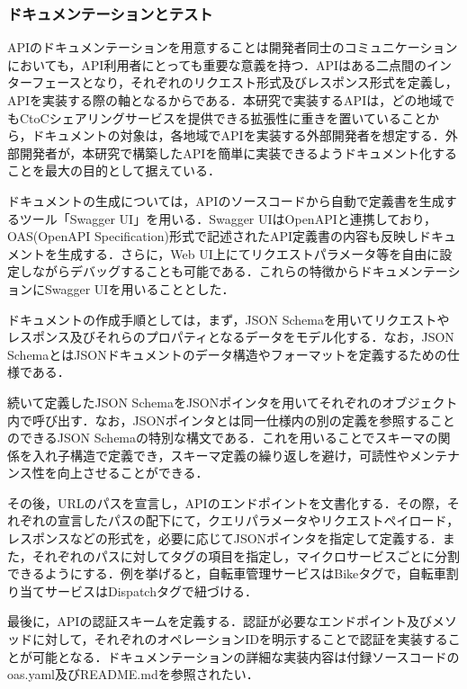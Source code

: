       \subsubsection{ドキュメンテーションとテスト}
        \label{sec:ドキュメンテーションとテスト}
          \par APIのドキュメンテーションを用意することは開発者同士のコミュニケーションにおいても，API利用者にとっても重要な意義を持つ．APIはある二点間のインターフェースとなり，それぞれのリクエスト形式及びレスポンス形式を定義し，APIを実装する際の軸となるからである．本研究で実装するAPIは，どの地域でもCtoCシェアリングサービスを提供できる拡張性に重きを置いていることから，ドキュメントの対象は，各地域でAPIを実装する外部開発者を想定する．外部開発者が，本研究で構築したAPIを簡単に実装できるようドキュメント化することを最大の目的として据えている．
          \par ドキュメントの生成については，APIのソースコードから自動で定義書を生成するツール「Swagger UI」を用いる．Swagger UIはOpenAPIと連携しており，OAS(OpenAPI Specification)形式で記述されたAPI定義書の内容も反映しドキュメントを生成する．さらに，Web UI上にてリクエストパラメータ等を自由に設定しながらデバッグすることも可能である．これらの特徴からドキュメンテーションにSwagger UIを用いることとした．
          \par ドキュメントの作成手順としては，まず，JSON Schemaを用いてリクエストやレスポンス及びそれらのプロパティとなるデータをモデル化する．なお，JSON SchemaとはJSONドキュメントのデータ構造やフォーマットを定義するための仕様である．
          \par 続いて定義したJSON SchemaをJSONポインタを用いてそれぞれのオブジェクト内で呼び出す．なお，JSONポインタとは同一仕様内の別の定義を参照することのできるJSON Schemaの特別な構文である．これを用いることでスキーマの関係を入れ子構造で定義でき，スキーマ定義の繰り返しを避け，可読性やメンテナンス性を向上させることができる．
          \par その後，URLのパスを宣言し，APIのエンドポイントを文書化する．その際，それぞれの宣言したパスの配下にて，クエリパラメータやリクエストペイロード，レスポンスなどの形式を，必要に応じてJSONポインタを指定して定義する．また，それぞれのパスに対してタグの項目を指定し，マイクロサービスごとに分割できるようにする．例を挙げると，自転車管理サービスはBikeタグで，自転車割り当てサービスはDispatchタグで紐づける．
          \par 最後に，APIの認証スキームを定義する．認証が必要なエンドポイント及びメソッドに対して，それぞれのオペレーションIDを明示することで認証を実装することが可能となる．ドキュメンテーションの詳細な実装内容は付録ソースコードのoas.yaml及びREADME.mdを参照されたい．
